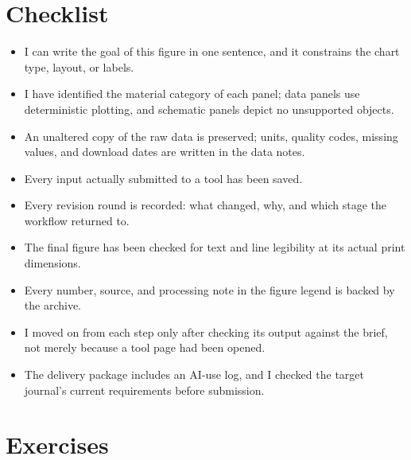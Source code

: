 \section{Checklist}

\begin{itemize}
\item I can write the goal of this figure in one sentence, and it constrains the chart type, layout, or labels.
\item I have identified the material category of each panel; data panels use deterministic plotting, and schematic panels depict no unsupported objects.
\item An unaltered copy of the raw data is preserved; units, quality codes, missing values, and download dates are written in the data notes.
\item Every input actually submitted to a tool has been saved.
\item Every revision round is recorded: what changed, why, and which stage the workflow returned to.
\item The final figure has been checked for text and line legibility at its actual print dimensions.
\item Every number, source, and processing note in the figure legend is backed by the archive.
\item I moved on from each step only after checking its output against the brief, not merely because a tool page had been opened.
\item The delivery package includes an AI-use log, and I checked the target journal's current requirements before submission.
\end{itemize}

\section{Exercises}

